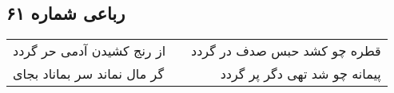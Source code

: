 \begin{center}
\section*{رباعی شماره ۶۱}
\label{sec:sh061}
\begin{longtable}{l p{0.5cm} r}
از رنج کشیدن آدمی حر گردد
&&
قطره چو کشد حبس صدف در گردد
\\
گر مال نماند سر بماناد بجای
&&
پیمانه چو شد تهی دگر پر گردد
\\
\end{longtable}
\end{center}
